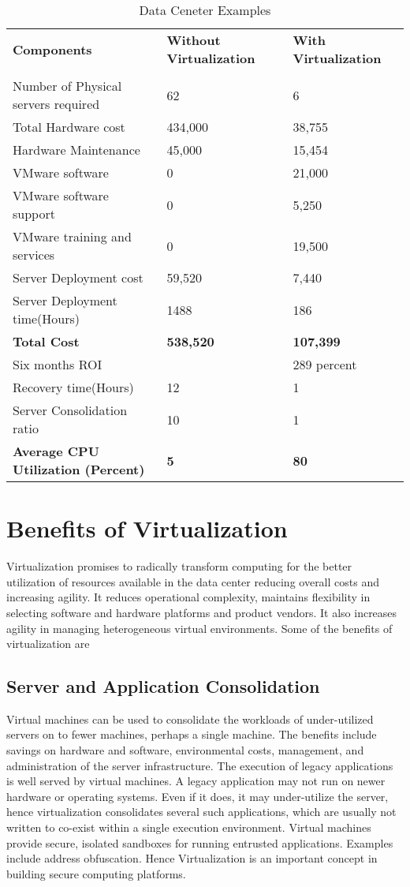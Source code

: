 \documentclass[12pt,a4paper]{report}
\begin{document}
\begin{table}
\begin{tabular}{l l l}

\textbf{Components} & \textbf{Without Virtualization} & \textbf{With Virtualization}\\
\\
Number of Physical servers required & 62 & 6 \\
Total Hardware cost & 434,000 & 38,755 \\
Hardware Maintenance & 45,000 & 15,454 \\
VMware software & 0 & 21,000 \\
VMware software support & 0 & 5,250 \\
VMware training and services & 0 & 19,500 \\
Server Deployment cost & 59,520 & 7,440 \\
Server Deployment time(Hours) & 1488 & 186 \\
\textbf{Total Cost} & \textbf{538,520} & \textbf{107,399} \\
Six months ROI &  & 289 percent \\
Recovery time(Hours) & 12 & 1 \\
Server Consolidation ratio & 10 & 1 \\
\textbf{Average CPU Utilization (Percent)} & \textbf{5} & \textbf{80} 

\end{tabular}
\caption{Data Ceneter Examples}
\end{table}

\newpage
\section{Benefits of Virtualization}
Virtualization promises to radically transform computing for the better utilization of resources available in the data center reducing overall costs and increasing agility. It reduces operational complexity, maintains flexibility in selecting software and hardware platforms and product vendors. It also increases agility in managing heterogeneous virtual environments. Some of the benefits of virtualization are\\

\subsection{Server and Application Consolidation} 
Virtual machines can be used to consolidate the workloads of under-utilized servers on to fewer machines, perhaps a single machine. The benefits include savings on hardware and software, environmental costs, management, and administration of the server infrastructure. The execution of legacy applications is well served by virtual machines. A legacy application may not run on newer hardware or operating systems. Even if it does, it may under-utilize the server, hence virtualization consolidates several such applications, which are usually not written to co-exist within a single execution environment. Virtual machines provide secure, isolated sandboxes for running entrusted applications. 
Examples include address obfuscation. Hence Virtualization is an important concept in building secure computing platforms. 
\end{document}
